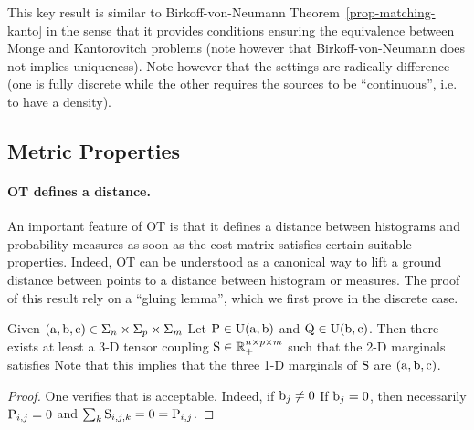 This key result is similar to Birkoff-von-Neumann Theorem~\ref{prop-matching-kanto} in the sense that it provides conditions ensuring the equivalence between Monge and Kantorovitch problems (note however that Birkoff-von-Neumann does not implies uniqueness). Note however that the settings are radically difference (one is fully discrete while the other requires the sources to  be ``continuous'', i.e. to have a density).


\subsection{Metric Properties}

\paragraph{OT defines a distance.}

An important feature of OT is that it defines a distance between histograms and probability measures as soon as the cost matrix satisfies certain suitable properties. Indeed, OT can be understood as a canonical way to lift a ground distance between points to a distance between histogram or measures. 
%
The proof of this result rely on a ``gluing lemma'', which we first prove in the discrete case.

\begin{lem}\label{lem-gluing-discr}
	Given $(\a,\b,\VectMode{c}) \in \simplex_n \times \simplex_p \times \simplex_m$ 
	Let $\P \in \CouplingsD(\a,\b)$ and $\Q \in \CouplingsD(\b,\VectMode{c})$. Then there exists at least a 3-D tensor coupling $\S \in \RR_+^{n \times p \times m}$ 
	such that the 2-D marginals satisfies 
	Note that this implies that the three 1-D marginals of $\S$ are $(\a,\b,\VectMode{c})$.
\end{lem}
\begin{proof}
	One verifies that
	is acceptable. Indeed, if $\b_j \neq 0$
	If $\b_j = 0$, then necessarily $\P_{i,j}=0$ and $\sum_{k} \S_{i,j,k} = 0 = \P_{i,j}$.
\end{proof}

